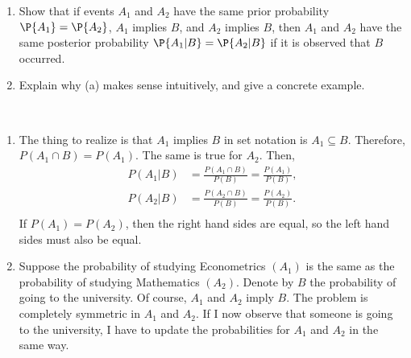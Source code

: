 

\setcounter{theorem}{5}

\begin{exercise} [BH.2.6] 
 \begin{enumerate}
		\item Show that if events $A_1$ and $A_2$ have the same prior probability $\P{A_1} = \P{A_2}$, $A_1$ implies $B$, and $A_2$ implies $B$, then $A_1$ and $A_2$ have the same posterior probability $\P{A_1|B} = \P{A_2|B}$ if it is observed that $B$ occurred.
		\item Explain why (a) makes sense intuitively, and give a concrete example.
	\end{enumerate}
\begin{solution}~
	\begin{enumerate}
		\item The thing to realize is that $A_{1}$ implies $B$ in set notation is $A_{1}\subseteq B$. Therefore, $P(A_{1}\cap B) = P(A_1)$. The same is true for $A_{2}$. Then,
		\begin{align*}
			P(A_{1}|B) &= \frac{P(A_{1}\cap B)}{P(B)} = \frac{P(A_{1})}{P(B)},\\
			P(A_{2}|B) &= \frac{P(A_{2}\cap B)}{P(B)} = \frac{P(A_{2})}{P(B)}.\\
		\end{align*}
		If $P(A_{1})=P(A_{2})$, then the right hand sides are equal, so the left hand sides must also be equal.
		\item Suppose the probability of studying Econometrics $(A_{1})$ is the same as the probability of studying Mathematics $(A_{2})$. Denote by $B$ the probability of going to the university. Of course, $A_{1}$ and $A_{2}$ imply $B$. The problem is completely symmetric in $A_{1}$ and $A_{2}$. If I now observe that someone is going to the university, I have to update the probabilities for $A_{1}$ and $A_{2}$ in the same way. 
	\end{enumerate}
  \end{solution}
\end{exercise}


